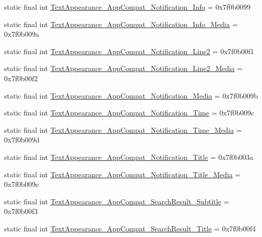 \begin{CompactItemize}
\item 
static final int \hyperlink{classandroid_1_1support_1_1graphics_1_1drawable_1_1animated_1_1_r_1_1style_9dd9ce9ad3984507f7c108f13a66e60b}{TextAppearance\_\-AppCompat\_\-Notification\_\-Info} = 0x7f0b0099
\item 
static final int \hyperlink{classandroid_1_1support_1_1graphics_1_1drawable_1_1animated_1_1_r_1_1style_975677379dcd6616dd2d76efb478570a}{TextAppearance\_\-AppCompat\_\-Notification\_\-Info\_\-Media} = 0x7f0b009a
\item 
static final int \hyperlink{classandroid_1_1support_1_1graphics_1_1drawable_1_1animated_1_1_r_1_1style_89e68a2aae9e22c606dc494ccc80d8b8}{TextAppearance\_\-AppCompat\_\-Notification\_\-Line2} = 0x7f0b00f1
\item 
static final int \hyperlink{classandroid_1_1support_1_1graphics_1_1drawable_1_1animated_1_1_r_1_1style_8f3656beff9da72163eedc5ec61d0441}{TextAppearance\_\-AppCompat\_\-Notification\_\-Line2\_\-Media} = 0x7f0b00f2
\item 
static final int \hyperlink{classandroid_1_1support_1_1graphics_1_1drawable_1_1animated_1_1_r_1_1style_55d4d6b8b48d546a3b2d3293896410a4}{TextAppearance\_\-AppCompat\_\-Notification\_\-Media} = 0x7f0b009b
\item 
static final int \hyperlink{classandroid_1_1support_1_1graphics_1_1drawable_1_1animated_1_1_r_1_1style_b20101487589f7414988bb012266ebf8}{TextAppearance\_\-AppCompat\_\-Notification\_\-Time} = 0x7f0b009c
\item 
static final int \hyperlink{classandroid_1_1support_1_1graphics_1_1drawable_1_1animated_1_1_r_1_1style_289715b127ef7170aeea57a86e4e622a}{TextAppearance\_\-AppCompat\_\-Notification\_\-Time\_\-Media} = 0x7f0b009d
\item 
static final int \hyperlink{classandroid_1_1support_1_1graphics_1_1drawable_1_1animated_1_1_r_1_1style_ca1337f7b122c8b55cda4c951aa2b013}{TextAppearance\_\-AppCompat\_\-Notification\_\-Title} = 0x7f0b003a
\item 
static final int \hyperlink{classandroid_1_1support_1_1graphics_1_1drawable_1_1animated_1_1_r_1_1style_59bd92da64bb9b860b7bfb95c83ec1f4}{TextAppearance\_\-AppCompat\_\-Notification\_\-Title\_\-Media} = 0x7f0b009e
\item 
static final int \hyperlink{classandroid_1_1support_1_1graphics_1_1drawable_1_1animated_1_1_r_1_1style_a080bceeef14657914108f98601dc5f3}{TextAppearance\_\-AppCompat\_\-SearchResult\_\-Subtitle} = 0x7f0b00f3
\item 
static final int \hyperlink{classandroid_1_1support_1_1graphics_1_1drawable_1_1animated_1_1_r_1_1style_fddf5e24c297269afa8cc03149e0b5ef}{TextAppearance\_\-AppCompat\_\-SearchResult\_\-Title} = 0x7f0b00f4

\end{CompactItemize}
